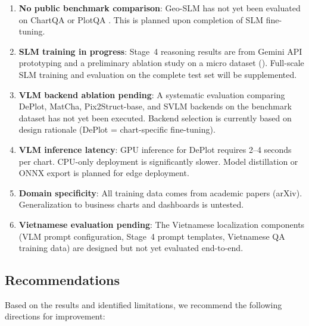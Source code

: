 \begin{enumerate}
    \item \textbf{No public benchmark comparison}: Geo-SLM has not yet been evaluated
          on ChartQA \cite{masry2022chartqa} or PlotQA \cite{methani2020plotqa}.
          This is planned upon completion of SLM fine-tuning.
    \item \textbf{SLM training in progress}: Stage~4 reasoning results are from Gemini
          API prototyping and a preliminary ablation study on a micro dataset
          (). Full-scale SLM training and evaluation on the
          complete test set will be supplemented.
    \item \textbf{VLM backend ablation pending}: A systematic evaluation comparing
          DePlot, MatCha, Pix2Struct-base, and SVLM backends on the benchmark dataset
          has not yet been executed. Backend selection is currently based on design
          rationale (DePlot = chart-specific fine-tuning).
    \item \textbf{VLM inference latency}: GPU inference for DePlot requires 2--4 seconds
          per chart. CPU-only deployment is significantly slower. Model distillation
          or ONNX export is planned for edge deployment.
    \item \textbf{Domain specificity}: All training data comes from academic papers
          (arXiv). Generalization to business charts and dashboards is untested.
    \item \textbf{Vietnamese evaluation pending}: The Vietnamese localization components
          (VLM prompt configuration, Stage~4 prompt templates, Vietnamese QA training
          data) are designed but not yet evaluated end-to-end.
\end{enumerate}


\subsection{Recommendations}

Based on the results and identified limitations, we recommend the following directions
for improvement:

